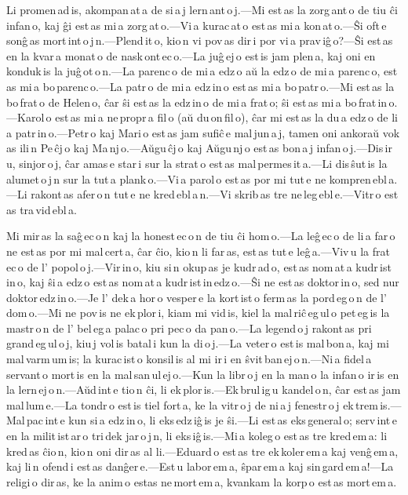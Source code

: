 \documentclass[ngerman,12pt,twoside]{book}
\begin{document}

Li promen\,ad\,is, akompan\,at\,a de si\,a\,j lern\,ant\,o\,j.---Mi est\,as la zorg\,ant\,o de tiu ĉi infan\,o, kaj ĝi est\,as mi\,a zorg\,at\,o.---Vi\,a kurac\,at\,o est\,as mi\,a kon\,at\,o.---Ŝi oft\,e sonĝ\,as mort\,int\,o\,j\,n.---Plend\,it\,o, kio\,n vi pov\,as dir\,i por vi\,a prav\,iĝ\,o?---Ŝi est\,as en la kvar\,a monat\,o de nask\,ont\,ec\,o.---La juĝ\,ej\,o est\,is jam plen\,a, kaj oni en\,konduk\,is la juĝ\,ot\,o\,n.---La parenc\,o de mi\,a edz\,o aŭ la edz\,o de mi\,a parenc\,o, est\,as mi\,a bo\,parenc\,o.---La patr\,o de mi\,a edz\,in\,o est\,as mi\,a bo\,patr\,o.---Mi est\,as la bo\,frat\,o de Helen\,o, ĉar ŝi est\,as la edz\,in\,o de mi\,a frat\,o; ŝi est\,as mi\,a bo\,frat\,in\,o.---Karol\,o est\,as mi\,a ne\,propr\,a fil\,o (aŭ du\,on\,fil\,o), ĉar mi est\,as la du\,a edz\,o de li\,a patr\,in\,o.---Petr\,o kaj Mari\,o est\,as jam sufiĉ\,e mal\,jun\,a\,j, tamen oni ankoraŭ vok\,as ili\,n Pe\,ĉj\,o kaj Ma\,nj\,o.---Aŭgu\,ĉj\,o kaj Aŭgu\,nj\,o est\,as bon\,a\,j infan\,o\,j.---Dis\,ir\,u, sinjor\,o\,j, ĉar amas\,e star\,i sur la strat\,o est\,as mal\,permes\,it\,a.---Li dis\,ŝut\,is la alumet\,o\,j\,n sur la tut\,a plank\,o.---Vi\,a parol\,o est\,as por mi tut\,e ne kompren\,ebl\,a.---Li rakont\,as afer\,o\,n tut\,e ne kred\,ebl\,a\,n.---Vi skrib\,as tre ne\,leg\,ebl\,e.---Vitr\,o est\,as tra\,vid\,ebl\,a. 



Mi mir\,as la saĝ\,ec\,o\,n kaj la honest\,ec\,o\,n de tiu ĉi hom\,o.---La leĝ\,ec\,o de li\,a far\,o ne est\,as por mi mal\,cert\,a, ĉar ĉio, kio\,n li far\,as, est\,as tut\,e leĝ\,a.---Viv\,u la frat\,ec\,o de l' popol\,o\,j.---Vir\,in\,o, kiu si\,n okup\,as je kudr\,ad\,o, est\,as nom\,at\,a kudr\,ist\,in\,o, kaj ŝi\,a edz\,o est\,as nom\,at\,a kudr\,ist\,in\,edz\,o.---Ŝi ne est\,as doktor\,in\,o, sed nur doktor\,edz\,in\,o.---Je l' dek\,a hor\,o vesper\,e la kort\,ist\,o ferm\,as la pord\,eg\,o\,n de l' dom\,o.---Mi ne pov\,is ne ek\,plor\,i, kiam mi vid\,is, kiel la mal\,riĉ\,eg\,ul\,o pet\,eg\,is la mastr\,o\,n de l' bel\,eg\,a palac\,o pri pec\,o da pan\,o.---La legend\,o\,j rakont\,as pri grand\,eg\,ul\,o\,j, kiu\,j vol\,is batal\,i kun la di\,o\,j.---La veter\,o est\,is mal\,bon\,a, kaj mi mal\,varm\,um\,is; la kurac\,ist\,o konsil\,is al mi ir\,i en ŝvit\,ban\,ej\,o\,n.---Ni\,a fidel\,a servant\,o mort\,is en la mal\,san\,ul\,ej\,o.---Kun la libr\,o\,j en la man\,o la infan\,o ir\,is en la lern\,ej\,o\,n.---Aŭd\,int\,e tio\,n ĉi, li ek\,plor\,is.---Ek\,brul\,ig\,u kandel\,o\,n, ĉar est\,as jam mal\,lum\,e.---La tondr\,o est\,is tiel fort\,a, ke la vitr\,o\,j de ni\,a\,j fenestr\,o\,j ek\,trem\,is.---Mal\,pac\,int\,e kun si\,a edz\,in\,o, li eks\,edz\,iĝ\,is je ŝi.---Li est\,as eks\,general\,o; serv\,int\,e en la milit\,ist\,ar\,o tri\,dek jar\,o\,j\,n, li eks\,iĝ\,is.---Mi\,a koleg\,o est\,as tre kred\,em\,a: li kred\,as ĉio\,n, kio\,n oni dir\,as al li.---Eduard\,o est\,as tre ek\,koler\,em\,a kaj venĝ\,em\,a, kaj li\,n ofend\,i est\,as danĝer\,e.---Est\,u labor\,em\,a, ŝpar\,em\,a kaj sin\,gard\,em\,a!---La religi\,o dir\,as, ke la anim\,o estas ne\,mort\,em\,a, kvankam la korp\,o est\,as mort\,em\,a. 
\end{document}
